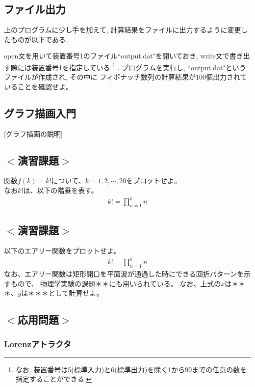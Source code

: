 \documentclass[a4j]{jsbook}
\begin{document}
\subsection*{ファイル出力}
上のプログラムに少し手を加えて, 計算結果をファイルに出力するように変更したものが以下である.

open文を用いて装置番号1のファイル``output.dat"を開いておき,
write文で書き出す際には装置番号1を指定している
\footnote{
  なお, 装置番号は5(標準入力)と6(標準出力)を除く1から99までの任意の数を指定することができる.
}
.
プログラムを実行し, ``output.dat"というファイルが作成され, その中に
フィボナッチ数列の計算結果が100個出力されていることを確認せよ。
\\


\subsection*{グラフ描画入門}
[グラフ描画の説明]

\subsection*{$<$演習課題$>$}
関数$f(k) = k!$について、$k=1,2, \cdots, 20$をプロットせよ。\\
なお$k!$は、以下の階乗を表す。
\begin{eqnarray}
k! = \prod_{n=1}^{k} n
\end{eqnarray}

\subsection*{$<$演習課題$>$}
以下のエアリー関数をプロットせよ。
\begin{eqnarray}
k! = \prod_{n=1}^{k} n
\end{eqnarray}
なお、エアリー関数は矩形開口を平面波が通過した時にできる回折パターンを示すもので、
物理学実験の課題＊＊にも用いられている。
なお、上式の$x$は＊＊＊、$y$は＊＊＊として計算せよ。

\subsection*{$<$応用問題$>$}
\subsubsection{Lorenzアトラクタ}
\end{document}
